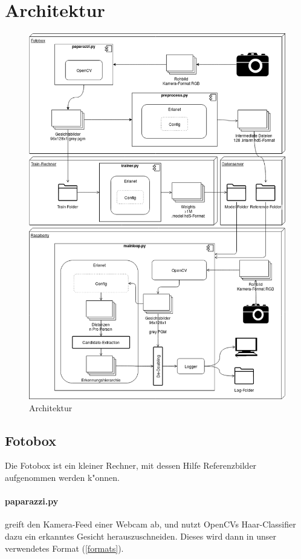 \documentclass[12pt]{article}
\begin{document}
\section{Architektur}
\newpage
\afterpage{\clearpage}
\begin{figure}[H]
    \includegraphics[height=0.9\textheight]{Architektur}
    \caption{Architektur}
\end{figure}

\subsection{Fotobox}
Die Fotobox ist ein kleiner Rechner,
mit dessen Hilfe Referenzbilder aufgenommen werden
k"onnen.
\paragraph{paparazzi.py}
greift den Kamera-Feed einer Webcam ab, und nutzt
OpenCVs Haar-Classifier dazu ein erkanntes Gesicht 
herauszuschneiden. Dieses wird dann in unser verwendetes
Format (\ref{formats}).
\end{document}
